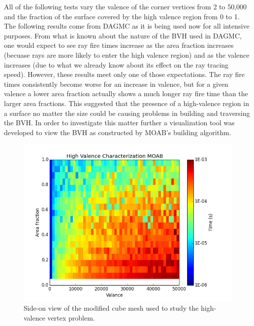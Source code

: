 \documentclass[12pt, a4paper]{article}
\begin{document}
All of the following tests vary the valence of the corner vertices from 2 to 50,000 and the fraction of the surface covered by the high valence region from 0 to 1. The following results come from DAGMC as it is being used now for all intensive purposes. From what is known about the nature of the BVH used in DAGMC, one would expect to see ray fire times increase as the area fraction increases (becuase rays are more likely to enter the high valence region) and as the valence increases (due to what we already know about its effect on the ray tracing speed). However, these results meet only one of those expectations. The ray fire times consistently become worse for an increase in valence, but for a given valence a lower area fraction actually shows a much longer ray fire time than the larger area fractions. This suggested that the presence of a high-valence region in a surface no matter the size could be causing problems in building and traversing the BVH. In order to investigate this matter further a visualization tool was developed to view the BVH as constructed by MOAB's building algorithm.

\begin{figure}[H]
  \centering
    \includegraphics[scale=0.35]{hv_study_MOAB.png}
    \caption{Side-on view of the modified cube mesh used to study the high-valence vertex problem.}
    \label{hvsideon}
\end{figure}
\end{document}
